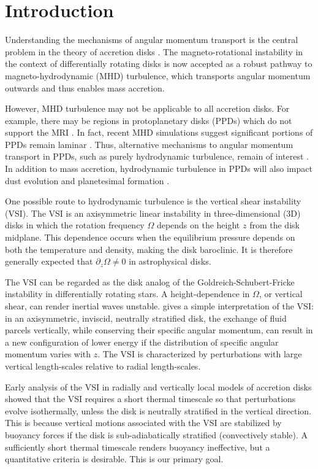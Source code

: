 \documentclass[iop]{emulateapj}
\newcommand{\p}{\partial}
\begin{document}
\section{Introduction}\label{intro}
Understanding the mechanisms of angular momentum transport is the
central problem in the theory of accretion disks 
\citep{lyndenbell74}. The   
magneto-rotational instability in the context of differentially
rotating disks \citep[MRI,][]{balbus91} is now accepted as a robust
pathway to magneto-hydrodynamic (MHD) turbulence, which transports
angular momentum outwards and thus enables mass accretion. 

However, MHD turbulence may not be applicable to all  
accretion disks. For example, there may be regions in protoplanetary  
disks (PPDs) which do not support the MRI 
\citep{gammie96,landry13}. In fact, recent MHD simulations
suggest significant portions of PPDs remain laminar \citep[e.g.][and references
therein]{lesur14,bai15,gressel15}. Thus, alternative mechanisms 
to angular momentum transport in PPDs, such as purely hydrodynamic
turbulence,  remain of interest \citep{armitage10}. In addition to
mass accretion, hydrodynamic turbulence in PPDs will also
impact dust evolution and planetesimal formation \citep{chiang10}. 

One possible route to hydrodynamic turbulence is the vertical shear
instability (VSI). The VSI is an 
axisymmetric linear instability 
in three-dimensional (3D) disks in which the rotation frequency
$\Omega$ depends on the height $z$ from the disk midplane. This
dependence occurs when the equilibrium pressure depends on both the
temperature and density, making the disk baroclinic. It is therefore
generally expected that $\p_z\Omega\neq 0$ in astrophysical disks.  

The VSI can be regarded as the disk analog of the
Goldreich-Schubert-Fricke instability 
\citep[GSF,][]{goldreich67,fricke68} in differentially rotating stars.   
A height-dependence in $\Omega$, or vertical shear, can render
inertial waves unstable. \cite{barker15} gives a simple 
interpretation of the VSI: in an axisymmetric, inviscid, neutrally
stratified disk, the exchange of fluid parcels vertically, while
conserving their specific angular momentum, can result in a new
configuration of lower energy if the distribution of specific angular
momentum varies with $z$. The VSI is characterized by perturbations
with large vertical length-scales  relative to radial length-scales.   

Early analysis of the VSI in radially and vertically local 
models of accretion disks \citep{urpin98,urpin03} showed that the VSI
requires a short thermal timescale so that perturbations evolve 
isothermally, unless the disk is neutrally stratified in the vertical
direction. This is because
vertical motions associated with the VSI 
are stabilized by buoyancy forces if the disk is sub-adiabatically
stratified (convectively stable). A sufficiently short thermal
timescale renders buoyancy ineffective, but a quantitative criteria is
desirable. This is our primary goal.  
\end{document}

